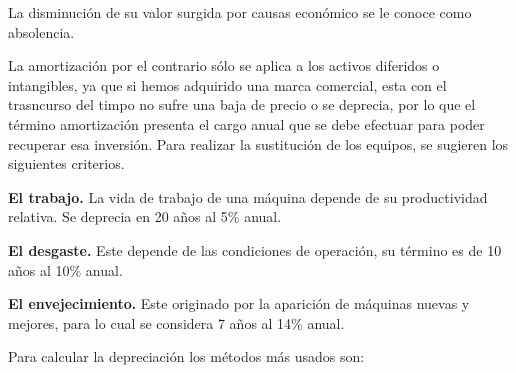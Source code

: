 La disminución de su valor surgida por causas económico se le conoce como absolencia.

La amortización por el contrario sólo se aplica a los activos diferidos o intangibles, ya que si hemos
adquirido una marca comercial, esta con el trasncurso del timpo no sufre una baja de precio o se deprecia,
por lo que el término amortización presenta el cargo anual que se debe efectuar para poder recuperar esa inversión.
Para realizar la sustitución de los equipos, se sugieren los siguientes criterios.

\textbf{El trabajo.} La vida de trabajo de una máquina depende de su productividad relativa. Se deprecia
en 20 años al 5\% anual.

\textbf{El desgaste.} Este depende de las condiciones de operación, su término es de 10 años al 10\% anual.

\textbf{El envejecimiento.} Este originado por la aparición de máquinas nuevas y mejores, para lo cual se
considera 7 años al 14\% anual.

Para calcular la depreciación los métodos más usados son: